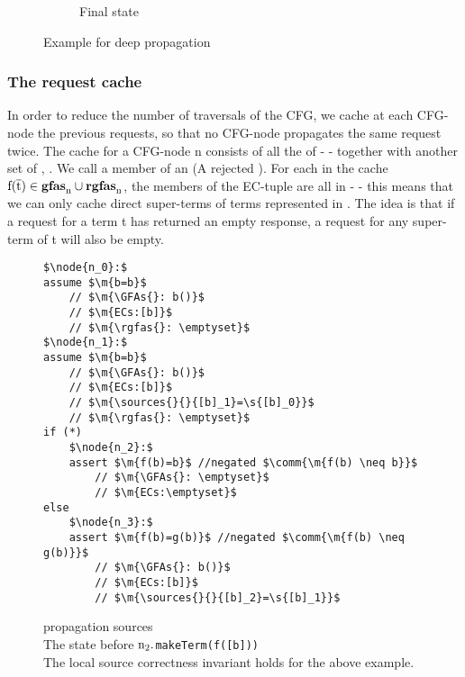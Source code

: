 \begin{figure}
\begin{subfigure}[t]{0.49\textwidth}
{{
}}
\caption{
Final state
}
\label{snippet3.18_graph.3}
\end{subfigure}

\caption{Example for deep propagation}
\end{figure}

















\subsubsection*{The request cache}
In order to reduce the number of traversals of the CFG, we cache at each CFG-node the previous requests, so that no CFG-node propagates the same request twice. The cache for a CFG-node n consists of all the \GFAs{} of  -  - together with another set of \GFAs, . We call a member of  an \RGFA{} (A rejected \GFA{}). For each \GFA{} in the cache $\mathrm{f}(\mathrm{\overline{t}}) \in \mathrm{\mathbf{gfas}_{n}} \cup \mathrm{\mathbf{rgfas}_{n}}$, the members of the EC-tuple  are all in  -  - this means that we can only cache direct super-terms of terms represented in . 
The idea is that if a request for a term t has returned an empty response, a request for any super-term of t will also be empty.


\begin{figure}
\begin{lstlisting}
$\node{n_0}:$
assume $\m{b=b}$
	// $\m{\GFAs{}: b()}$
	// $\m{ECs:[b]}$
	// $\m{\rgfas{}: \emptyset}$
$\node{n_1}:$
assume $\m{b=b}$
	// $\m{\GFAs{}: b()}$
	// $\m{ECs:[b]}$
	// $\m{\sources{}{}{[b]_1}=\s{[b]_0}}$
	// $\m{\rgfas{}: \emptyset}$
if (*)
	$\node{n_2}:$
	assert $\m{f(b)=b}$ //negated $\comm{\m{f(b) \neq b}}$
		// $\m{\GFAs{}: \emptyset}$
		// $\m{ECs:\emptyset}$
else
	$\node{n_3}:$
	assert $\m{f(b)=g(b)}$ //negated $\comm{\m{f(b) \neq g(b)}}$
		// $\m{\GFAs{}: b()}$
		// $\m{ECs:[b]}$
		// $\m{\sources{}{}{[b]_2}=\s{[b]_1}}$
\end{lstlisting}
\caption{propagation sources\\
The state before $\mathrm{n_2.}$\lstinline|makeTerm(f([b]))|\\
The local source correctness invariant holds for the above example.
}
\label{snippet3.16c}
\end{figure}


